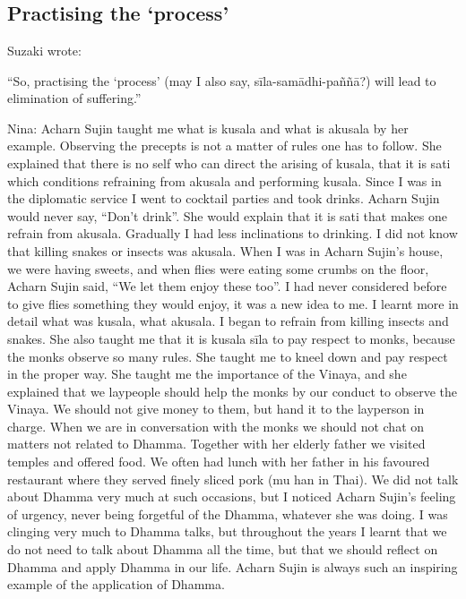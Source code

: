 \chapter[Practising the `process']{}
\section*{Practising the `process'}



Suzaki wrote:

``So, practising the `process' (may I also say, sīla-samādhi-paññā?) will lead to elimination of suffering.”

Nina: Acharn Sujin taught me what is kusala and what is akusala by her example. Observing the precepts is not a matter of rules one has to follow. She explained that there is no self who can direct the arising of kusala, that it is sati which conditions refraining from akusala and performing kusala. Since I was in the diplomatic service I went to cocktail parties and took drinks. Acharn Sujin would never say, ``Don’t drink''. She would explain that it is sati that makes one refrain from akusala. Gradually I had less inclinations to drinking. I did not know that killing snakes or insects was akusala. When I was in Acharn Sujin’s house, we were having sweets, and when flies were eating some crumbs on the floor, Acharn Sujin said, ``We let them enjoy these too”. I had never considered before to give flies something they would enjoy, it was a new idea to me. I learnt more in detail what was kusala, what akusala. I began to refrain from killing insects and snakes. She also taught me that it is kusala sīla to pay respect to monks, because the monks observe so many rules. She taught me to kneel down and pay respect in the proper way. She taught me the importance of the Vinaya, and she explained that we laypeople should help the monks by our conduct to observe the Vinaya. We should not give money to them, but hand it to the layperson in charge. When we are in conversation with the monks we should not chat on matters not related to Dhamma. Together with her elderly father we visited temples and offered food. We often had lunch with her father in his favoured restaurant where they served finely sliced pork (mu han in Thai). We did not talk about Dhamma very much at such occasions, but I noticed Acharn Sujin’s feeling of urgency, never being forgetful of the Dhamma, whatever she was doing. I was clinging very much to Dhamma talks, but throughout the years I learnt that we do not need to talk about Dhamma all the time, but that we should reflect on Dhamma and apply Dhamma in our life. Acharn Sujin is always such an inspiring example of the application of Dhamma.

